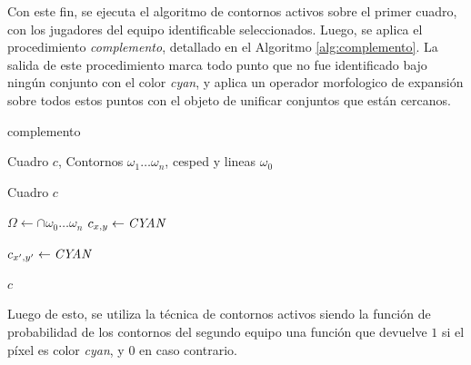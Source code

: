 Con este fin, se ejecuta el algoritmo de contornos activos sobre el primer
cuadro, con los jugadores del equipo identificable seleccionados. Luego, se
aplica el procedimiento \textit{complemento}, detallado en el Algoritmo
\ref{alg:complemento}. La salida de este procedimiento marca todo punto que no
fue identificado bajo ningún conjunto con el color \textit{cyan}, y aplica un
operador morfologico de expansión sobre todos estos puntos con el objeto
de unificar conjuntos que están cercanos.

\begin{algorithm}
    \caption{complemento}
    \label{alg:complemento}
    \begin{algorithmic}
    \Require\hspace{\algorithmicindent}\hspace{\algorithmicindent}Cuadro $c$, Contornos $\omega_1 \dots \omega_n$,
    cesped y lineas $\omega_0$

    \Ensure\hspace{\algorithmicindent}\hspace{0.23cm} Cuadro $c$
    \State

    \State $\Omega \gets \cap{\omega_0 \dots \omega_n}$
            \State $c_{x, y} \gets \text{\textit{CYAN}}$

                \State $c_{x', y'} \gets \text{\textit{CYAN}}$
            \EndFor
        \EndIf
    \EndFor

    \State \Return $c$
    \end{algorithmic}
\end{algorithm}

Luego de esto, se utiliza la técnica de contornos activos siendo la función de
probabilidad de los contornos del segundo equipo una función que devuelve $1$
si el píxel es color \textit{cyan}, y $0$ en caso contrario.

